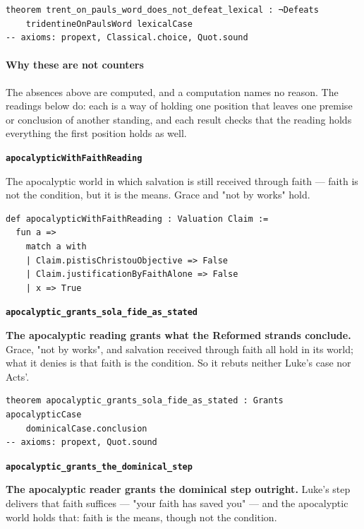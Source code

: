 \documentclass[11pt]{article}
\begin{document}
{\small\begin{verbatim}
theorem trent_on_pauls_word_does_not_defeat_lexical : ¬Defeats
    tridentineOnPaulsWord lexicalCase
-- axioms: propext, Classical.choice, Quot.sound
\end{verbatim}}
\paragraph*{Why these are not counters}
\leavevmode\par
The absences above are computed, and a computation names no reason. The readings below do: each is a way of holding one position that leaves one premise or conclusion of another standing, and each result checks that the reading holds everything the first position holds as well.

\par\medskip\noindent\textbf{\texttt{apocalyptic\allowbreak{}With\allowbreak{}Faith\allowbreak{}Reading}}\par\nobreak\noindent
The apocalyptic world in which salvation is still received through faith — faith is not the condition, but it is the means. Grace and "not by works" hold.

{\small\begin{verbatim}
def apocalypticWithFaithReading : Valuation Claim :=
  fun a =>
    match a with
    | Claim.pistisChristouObjective => False
    | Claim.justificationByFaithAlone => False
    | x => True
\end{verbatim}}
\par\medskip\noindent\textbf{\texttt{apocalyptic\_\allowbreak{}grants\_\allowbreak{}sola\_\allowbreak{}fide\_\allowbreak{}as\_\allowbreak{}stated}}\par\nobreak\noindent
\textbf{The apocalyptic reading grants what the Reformed strands conclude.} Grace, "not by works", and salvation received through faith all hold in its world; what it denies is that faith is the condition. So it rebuts neither Luke's case nor Acts'.

{\small\begin{verbatim}
theorem apocalyptic_grants_sola_fide_as_stated : Grants apocalypticCase
    dominicalCase.conclusion
-- axioms: propext, Quot.sound
\end{verbatim}}
\par\medskip\noindent\textbf{\texttt{apocalyptic\_\allowbreak{}grants\_\allowbreak{}the\_\allowbreak{}dominical\_\allowbreak{}step}}\par\nobreak\noindent
\textbf{The apocalyptic reader grants the dominical step outright.} Luke's step delivers that faith suffices — "your faith has saved you" — and the apocalyptic world holds that: faith is the means, though not the condition.
\end{document}
